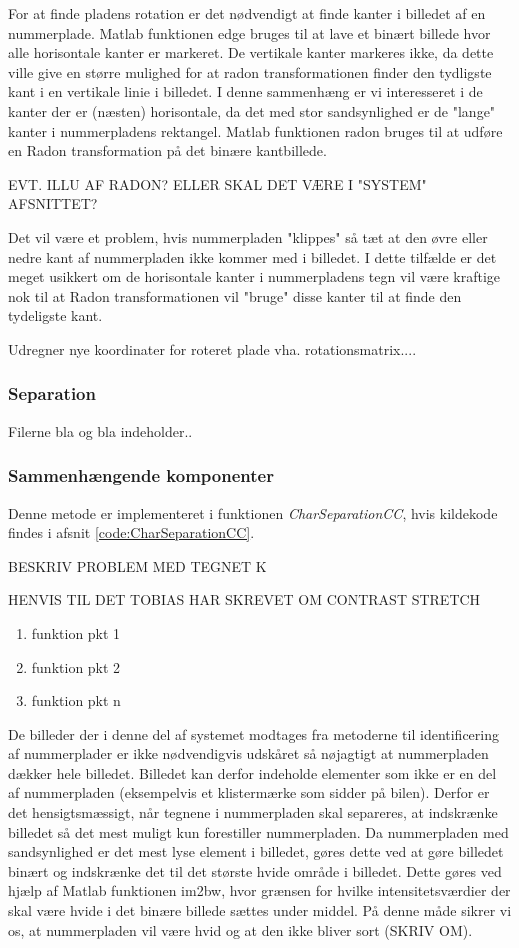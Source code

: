 For at finde pladens rotation er det nødvendigt at finde kanter i billedet af en nummerplade. Matlab funktionen edge bruges til at lave et binært billede hvor alle horisontale kanter er markeret. De vertikale kanter markeres ikke, da dette ville give en større mulighed for at radon transformationen finder den tydligste kant i en vertikale linie i billedet. I denne sammenhæng er vi interesseret i de kanter der er (næsten) horisontale, da det med stor sandsynlighed er de "lange" kanter i nummerpladens rektangel. Matlab funktionen radon bruges til at udføre en Radon transformation på det binære kantbillede.

EVT. ILLU AF RADON? ELLER SKAL DET VÆRE I "SYSTEM" AFSNITTET?

Det vil være et problem, hvis nummerpladen "klippes" så tæt at den øvre eller nedre kant af nummerpladen ikke kommer med i billedet. I dette tilfælde er det meget usikkert om de horisontale kanter i nummerpladens tegn vil være kraftige nok til at Radon transformationen vil "bruge" disse kanter til at finde den tydeligste kant.

Udregner nye koordinater for roteret plade vha. rotationsmatrix....

\subsubsection{Separation}

Filerne bla og bla indeholder..

\subsubsection*{Sammenhængende komponenter}

Denne metode er implementeret i funktionen \textit{CharSeparationCC}, hvis kildekode findes i afsnit \vref{code:CharSeparationCC}.

BESKRIV PROBLEM MED TEGNET K

HENVIS TIL DET TOBIAS HAR SKREVET OM CONTRAST STRETCH

\begin{enumerate}
\item funktion pkt 1
\item funktion pkt 2
\item funktion pkt n
\end{enumerate}

De billeder der i denne del af systemet modtages fra metoderne til identificering af nummerplader er ikke nødvendigvis udskåret så nøjagtigt at nummerpladen dækker hele billedet. Billedet kan derfor indeholde elementer som ikke er en del af nummerpladen (eksempelvis et klistermærke som sidder på bilen). Derfor er det hensigtsmæssigt, når tegnene i nummerpladen skal separeres, at indskrænke billedet så det mest muligt kun forestiller nummerpladen. Da nummerpladen med sandsynlighed er det mest lyse element i billedet, gøres dette ved at gøre billedet binært og indskrænke det til det største hvide område i billedet. Dette gøres ved hjælp af Matlab funktionen im2bw, hvor grænsen for hvilke intensitetsværdier der skal være hvide i det binære billede sættes under middel. På denne måde sikrer vi os, at nummerpladen vil være hvid og at den ikke bliver sort (SKRIV OM).

